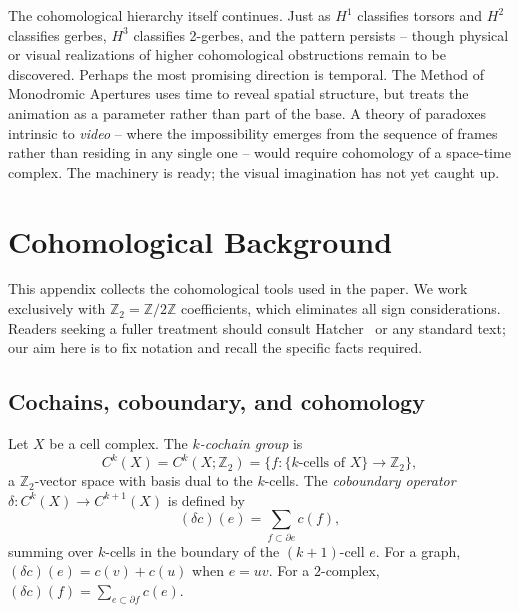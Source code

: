 \documentclass[11pt]{amsart}  %
\theoremstyle{plain}
\theoremstyle{definition}
\theoremstyle{remark}
\newcommand{\style}[1]{{\em #1}} %
\newcommand{\coboundary}{\delta} %
\newcommand{\Z}{\mathbb{Z}} %
\begin{document}
The cohomological hierarchy itself continues. Just as $H^1$ classifies torsors and $H^2$ classifies gerbes, $H^3$ classifies 2-gerbes, and the pattern persists -- though physical or visual realizations of higher cohomological obstructions remain to be discovered. Perhaps the most promising direction is temporal. The Method of Monodromic Apertures uses time to reveal spatial structure, but treats the animation as a parameter rather than part of the base. A theory of paradoxes intrinsic to \emph{video} -- where the impossibility emerges from the sequence of frames rather than residing in any single one -- would require cohomology of a space-time complex. The machinery is ready; the visual imagination has not yet caught up.





\appendix

\section{Cohomological Background}
\label{sec:appendix-cohomology}

This appendix collects the cohomological tools used in the paper. We work 
exclusively with $\Z_2 = \Z/2\Z$ coefficients, which eliminates all sign 
considerations. Readers seeking a fuller treatment should consult 
Hatcher~\cite{Hatcher2002} or any standard text; our aim here is to fix 
notation and recall the specific facts required.

\subsection{Cochains, coboundary, and cohomology}

Let $X$ be a cell complex. The \style{$k$-cochain group} is
\[
C^k(X) = C^k(X; \Z_2) = \{ f: \{\text{$k$-cells of $X$}\} \to \Z_2 \},
\]
a $\Z_2$-vector space with basis dual to the $k$-cells. The 
\style{coboundary operator} $\coboundary: C^k(X) \to C^{k+1}(X)$ is defined by
\[
(\coboundary c)(e) = \sum_{f \subset \partial e} c(f),
\]
summing over $k$-cells in the boundary of the $(k+1)$-cell $e$. For a graph, 
$(\coboundary c)(e) = c(v) + c(u)$ when $e = uv$. For a $2$-complex, 
$(\coboundary c)(f) = \sum_{e \subset \partial f} c(e)$.
\end{document}
